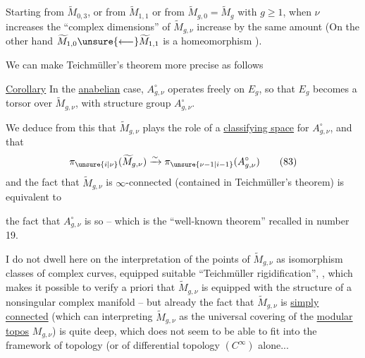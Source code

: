 Starting from \(\widetilde M_{0,3}\), or from \(\widetilde M_{1,1}\) or from \(\widetilde M_{g,0}=\widetilde M_g\) with \(g\geq 1\), when \(\nu\) increases the ``complex dimensions'' of \(\widetilde M_{g,\nu}\) increase by the same amount (On the other hand \(\widetilde M_{1,0}\unsure{\longleftarrow}\widetilde M_{1,1}\) is a homeomorphism ).

We can make Teichmüller's theorem more precise as follows

\uline{Corollary} In the \uline{anabelian} case, \(A_{g,\nu}^{\circ}\) operates freely on \(E_g\), so that \(E_g\) becomes a torsor over \(\widetilde M_{g,\nu}\), with structure group \(A_{g,\nu}^{\circ}\).

We deduce from this that \(\widetilde M_{g,\nu}\) plays the role of a \uline{classifying space} for \(A_{g,\nu}^{\circ}\), and that
\[
 \pi_{\unsure{i|\nu}}(\widetilde M_{g,\nu})
 \xrightarrow{\sim} \pi_{\unsure{\nu-1|i-1}}(A_{g,\nu}^{\circ})
 \tag{83}
\]
and the fact that \(\widetilde M_{g,\nu}\) is \(\infty\)-connected (contained in Teichmüller's theorem) is equivalent to


the fact that \(A_{g,\nu}^{\circ}\) is so -- which is the ``well-known theorem'' recalled in number 19.

I do not dwell here on the interpretation of the points of \(\widetilde M_{g,\nu}\) as isomorphism classes of complex curves, equipped   suitable ``Teichmüller rigidification'', , which makes it possible to verify a priori that \(\widetilde M_{g,\nu}\) is equipped with the structure of a nonsingular complex manifold -- but already the fact that \(\widetilde M_{g,\nu}\) is \uline{simply connected} (which can   interpreting \(\widetilde M_{g,\nu}\) as the universal covering of the \uline{modular topos} \(M_{g,\nu}\)) is quite deep, which does not seem to be able to fit into the framework of topology (or of differential topology \((C^\infty)\) alone...


